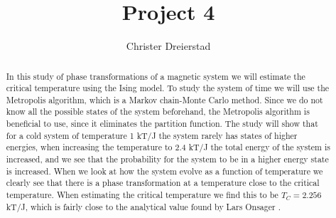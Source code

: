 \documentclass{emulateapj}
\begin{document}
\title{Project 4}

\author{Christer Dreierstad}





\begin{abstract}
In this study of phase transformations of a magnetic system we will estimate the critical temperature using the Ising model. To study the system of time we will use the Metropolis algorithm, which is a Markov chain-Monte Carlo method. Since we do not know all the possible states of the system beforehand, the Metropolis algorithm is beneficial to use, since it eliminates the partition function. The study will show that for a cold system of temperature 1 kT/J the system rarely has states of higher energies, when increasing the temperature to 2.4 kT/J the total energy of the system is increased, and we see that the probability for the system to be in a higher energy state is increased. When we look at how the system evolve as a function of temperature we clearly see that there is a phase transformation at a temperature close to the critical temperature. When estimating the critical temperature we find this to be $T_C = 2.256$ kT/J, which is fairly close to the analytical value found by Lars Onsager \cite{bib:onsager}.

\end{abstract}
\end{document}
